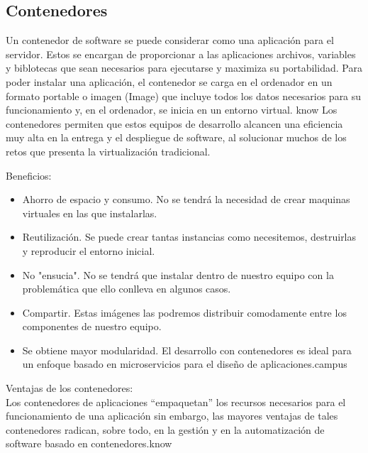 \documentclass[preprint,12pt]{elsarticle}
\begin{document}
\subsection{Contenedores}
\par Un contenedor de software se puede considerar como una aplicación para el servidor. Estos se encargan de proporcionar a las aplicaciones archivos, variables y biblotecas que sean necesarios para ejecutarse y maximiza su portabilidad.
Para poder instalar una aplicación, el contenedor se carga en el ordenador en un formato portable o imagen (Image) que incluye todos los datos necesarios para su funcionamiento y, en el ordenador, se inicia en un entorno virtual. {know}
Los contenedores permiten que estos equipos de desarrollo alcancen una eficiencia muy alta en la entrega y el despliegue de software, al solucionar muchos de los retos que presenta la virtualización tradicional.
\par Beneficios:
	\begin{itemize}
		\item Ahorro de espacio y consumo. No se tendrá la necesidad de crear maquinas virtuales en las que instalarlas.
		\item Reutilización. Se puede crear tantas instancias como necesitemos, destruirlas y reproducir el entorno inicial.
		\item No "ensucia". No se tendrá que instalar dentro de nuestro equipo con la problemática que ello conlleva en algunos casos.
		\item Compartir. Estas imágenes las podremos distribuir comodamente entre los componentes de nuestro equipo.
		\item Se obtiene mayor modularidad. El desarrollo con contenedores es ideal para un enfoque basado en microservicios para el diseño de aplicaciones.{campus}
	\end{itemize}
\par Ventajas de los contenedores: \\
Los contenedores de aplicaciones “empaquetan” los recursos necesarios para el funcionamiento de una aplicación sin embargo, las mayores ventajas de tales contenedores radican, sobre todo, en la gestión y en la automatización de software basado en contenedores.{know}
\end{document}
